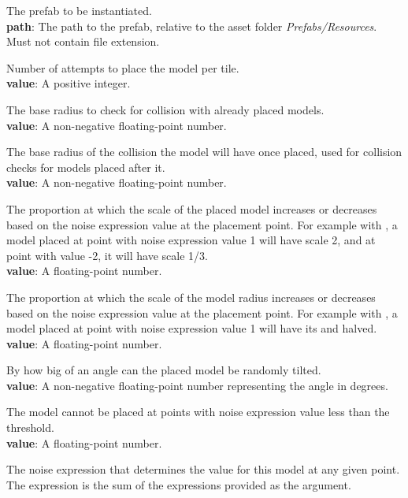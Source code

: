 The prefab to be instantiated.\\
\textbf{path}: The path to the prefab, relative to the asset folder \emph{Prefabs/Resources}. Must not contain file extension.

Number of attempts to place the model per tile.\\
\textbf{value}: A positive integer.

The base radius to check for collision with already placed models.\\
\textbf{value}: A non-negative floating-point number.

The base radius of the collision the model will have once placed, used for collision checks for models placed after it.\\
\textbf{value}: A non-negative floating-point number.

The proportion at which the scale of the placed model increases or decreases based on the noise expression value at the placement point.
For example with , a model placed at point with noise expression value 1 will have scale 2, and at point with value -2, it will have scale 1/3.\\
\textbf{value}: A floating-point number.

The proportion at which the scale of the model radius increases or decreases based on the noise expression value at the placement point.
For example with , a model placed at point with noise expression value 1 will have its  and  halved.\\
\textbf{value}: A floating-point number.

By how big of an angle can the placed model be randomly tilted.\\
\textbf{value}: A non-negative floating-point number representing the angle in degrees.

The model cannot be placed at points with noise expression value less than the threshold.\\
\textbf{value}: A floating-point number.

The noise expression that determines the value for this model at any given point.
The expression is the sum of the expressions provided as the argument.

